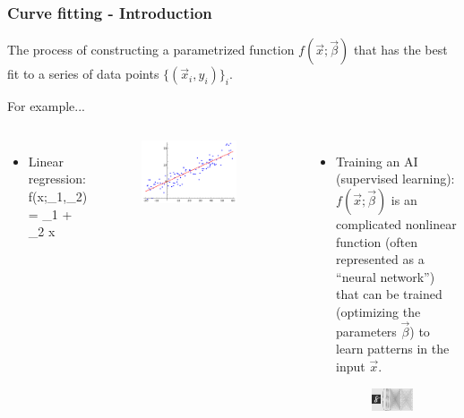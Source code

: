 \documentclass[10pt,aspectratio=169,handout]{beamer}
\begin{document}
\begin{frame}
	\frametitle{Curve fitting - Introduction}
	The process of constructing a parametrized function $f(\vec{x}; \vec{\beta})$ that has the best fit to a series of data points $\{(\vec{x}_i,y_i)\}_i$. \\ \pause
	
	\vspace{0.5pt}
	For example...
	\vspace{-0.5cm}
	\begin{columns}[t]
		\begin{itemize}[<+->]
		\item Linear regression:
		\bea
		f(x;\beta_1,\beta_2) = \beta_1 + \beta_2 x
		\eea
		\end{itemize}
		\begin{figure}
			\centering
			\includegraphics[width=0.8\textwidth]{fig/Linear_regression.svg.png}
		\end{figure}%

		\column{0.5\textwidth}
		\begin{itemize}[<+->]
			
			\item Training an AI (supervised learning):\\
			$f(\vec{x};\vec{\beta})$ is an complicated nonlinear function (often represented as a ``neural network'') that can be trained (optimizing the parameters $\vec{\beta}$) to learn patterns in the input $\vec{x}$.
			
			\begin{figure}
				\centering
				\includegraphics[width=0.8\textwidth]{fig/ann}
			\end{figure}%
		\end{itemize}
		\end{columns}

\end{frame}
\end{document}
